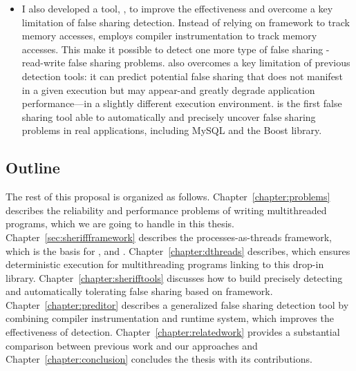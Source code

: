 \begin{itemize}
\item I also developed a tool, \predator{}, to improve the effectiveness and overcome a key  limitation of false sharing detection. Instead of relying on \sheriff{} framework to track memory accesses, \predator{} employs compiler instrumentation to track memory accesses. This make it possible to detect one more type of false sharing - read-write false sharing problems. \Predator{} also overcomes a key limitation of previous detection tools: it can predict potential false sharing that does not manifest in a given execution but may appear-and greatly degrade application performance—in a slightly different execution environment. \Predator is the first false sharing tool able to automatically and precisely uncover false sharing problems in real applications, including MySQL and the Boost library.


\end{itemize}

\subsection*{Outline}
The rest of this proposal is organized as follows. Chapter~\ref{chapter:problems} describes the reliability and performance problems of writing multithreaded programs, which we are going to handle in this thesis. Chapter~\ref{sec:sheriffframework} describes the processes-as-threads framework, which is the basis for \dthreads{}, \SheriffDetect{} and \SheriffProtect{}. Chapter~\ref{chapter:dthreads} describes\dthreads{}, which ensures deterministic execution for multithreading programs linking to this drop-in library. Chapter~\ref{chapter:sherifftools} discusses how to build precisely detecting and automatically tolerating false sharing based on \sheriff{} framework. Chapter~\ref{chapter:preditor} describes a generalized false sharing detection tool by combining compiler instrumentation and runtime system, which improves the effectiveness of detection. 
Chapter~\ref{chapter:relatedwork} provides a substantial comparison between previous work and our approaches and Chapter~\ref{chapter:conclusion} concludes the thesis with its contributions. 



